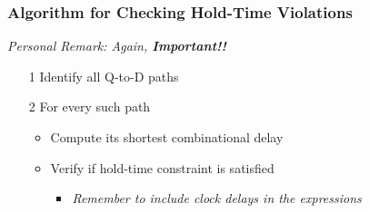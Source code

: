 \documentclass[12pt,openany]{book}
\begin{document}
\subsubsection*{Algorithm for Checking Hold-Time Violations}
\textit{Personal Remark: Again, \textbf{Important!!}}\newline
\vspace*{-10px}
\begin{itemize}
        \item[1] Identify all Q-to-D paths
        \item[2] For every such path
        \begin{itemize}
            \item Compute its shortest combinational delay
            \item Verify if hold-time constraint is satisfied
            \begin{itemize}
                \item \textit{Remember to include clock delays in the expressions}
            \end{itemize}
        \end{itemize}
\end{itemize}
\end{document}
